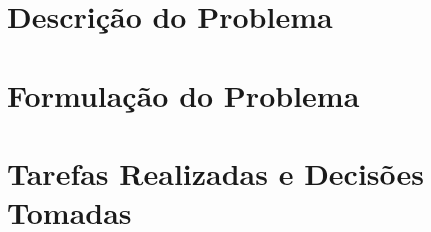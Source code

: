 \documentclass[a4paper,12pt]{scrreprt}
\begin{document}
\tableofcontents
\pagebreak

\listoffigures
\pagebreak

\listoftables
\pagebreak

\lstlistoflistings
\pagebreak





\chapter{Descrição do Problema}



\chapter{Formulação do Problema}



\chapter{Tarefas Realizadas e Decisões Tomadas}

\end{document}
